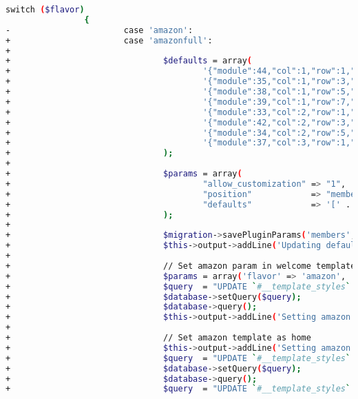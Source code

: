 \documentclass[10pt,letterpaper,titlepage]{article}
\begin{document}
\begin{lstlisting}[caption={Style for commit messages used in HubZERO web development.},language=Bash,label=badcommit]
                switch ($flavor)
                {
-                       case 'amazon':
+                       case 'amazonfull':
+
+                               $defaults = array(
+                                       '{"module":44,"col":1,"row":1,"size_x":1,"size_y":2}',
+                                       '{"module":35,"col":1,"row":3,"size_x":1,"size_y":2}',
+                                       '{"module":38,"col":1,"row":5,"size_x":1,"size_y":2}',
+                                       '{"module":39,"col":1,"row":7,"size_x":1,"size_y":2}',
+                                       '{"module":33,"col":2,"row":1,"size_x":1,"size_y":2}',
+                                       '{"module":42,"col":2,"row":3,"size_x":1,"size_y":2}',
+                                       '{"module":34,"col":2,"row":5,"size_x":1,"size_y":2}',
+                                       '{"module":37,"col":3,"row":1,"size_x":1,"size_y":2}'
+                               );
+
+                               $params = array(
+                                       "allow_customization" => "1",
+                                       "position"            => "memberDashboard",
+                                       "defaults"            => '[' . implode(',', $defaults) . ']'
+                               );
+
+                               $migration->savePluginParams('members', 'dashboard', $params);
+                               $this->output->addLine('Updating default members dashboard configuration');
+
+                               // Set amazon param in welcome template
+                               $params = array('flavor' => 'amazon', 'template' => 'hubbasic2013');
+                               $query  = "UPDATE `#__template_styles` SET `params` = " . $database->quote(json_encode($params)) . " WHERE `template` = 'welcome'";
+                               $database->setQuery($query);
+                               $database->query();
+                               $this->output->addLine('Setting amazon flavor flag in welcome template');
+
+                               // Set amazon template as home
+                               $this->output->addLine('Setting amazon template for welcome page');
+                               $query  = "UPDATE `#__template_styles` SET `home` = 1 where `template` = 'welcome' and `client_id` = 0";
+                               $database->setQuery($query);
+                               $database->query();
+                               $query  = "UPDATE `#__template_styles` SET `home` = 0 where `template` != 'welcome' and `client_id` = 0";

\end{lstlisting}
\end{document}
